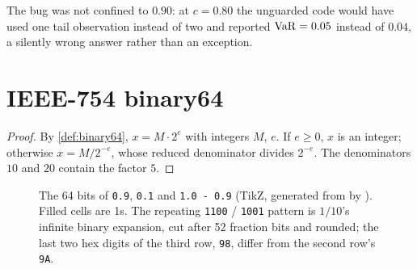 The bug was not confined to $0.90$: at $c=0.80$ the unguarded code would have used one tail observation instead of two and
reported $\mathrm{VaR}=0.05$ instead of $0.04$, a silently wrong answer rather than an exception.

\section{IEEE-754 binary64}

\begin{proof}
By \cref{def:binary64}, $x=M\cdot2^{e}$ with integers $M$, $e$. If $e\ge0$, $x$ is an integer; otherwise
$x=M/2^{-e}$, whose reduced denominator divides $2^{-e}$. The denominators $10$ and $20$ contain the factor $5$.
\end{proof}

\begin{figure}[htbp]
\centering
\resizebox{\linewidth}{!}{}
\caption{The 64 bits of \texttt{0.9}, \texttt{0.1} and \texttt{1.0 - 0.9} (TikZ, generated from  by
). Filled cells are 1s. The repeating \texttt{1100} / \texttt{1001} pattern is $1/10$'s
infinite binary expansion, cut after 52 fraction bits and rounded; the last two hex digits of the third row,
\texttt{98}, differ from the second row's \texttt{9A}.}
\label{fig:bits}
\end{figure}

